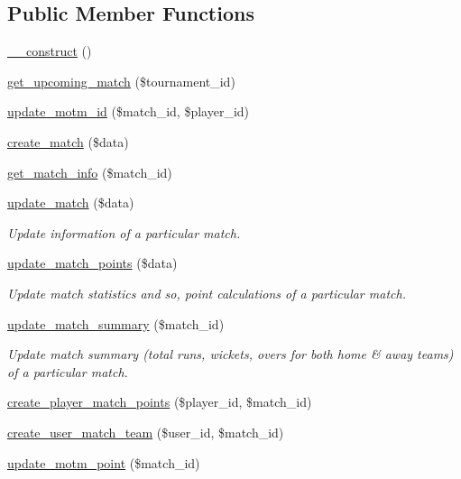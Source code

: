 \subsection*{Public Member Functions}
\begin{DoxyCompactItemize}
\item 
\hyperlink{class_match__model_a095c5d389db211932136b53f25f39685}{\+\_\+\+\_\+construct} ()
\item 
\hyperlink{class_match__model_af3e2fa219f3317391f8505b4fe790ada}{get\+\_\+upcoming\+\_\+match} (\$tournament\+\_\+id)
\item 
\hyperlink{class_match__model_a06064e208741b99d4c8f634bef3086b0}{update\+\_\+motm\+\_\+id} (\$match\+\_\+id, \$player\+\_\+id)
\item 
\hyperlink{class_match__model_ad797156fec1526814d0e7afa9922f453}{create\+\_\+match} (\$data)
\item 
\hyperlink{class_match__model_a0a059fea5654ff79dbd2aa1cc038e5e1}{get\+\_\+match\+\_\+info} (\$match\+\_\+id)
\item 
\hyperlink{class_match__model_ac88138156abfb53bfa57a299d788b43e}{update\+\_\+match} (\$data)
\begin{DoxyCompactList}\small\item\em Update information of a particular match. \end{DoxyCompactList}\item 
\hyperlink{class_match__model_a4ae724b3cc404915f9b4d33753278590}{update\+\_\+match\+\_\+points} (\$data)
\begin{DoxyCompactList}\small\item\em Update match statistics and so, point calculations of a particular match. \end{DoxyCompactList}\item 
\hyperlink{class_match__model_a3d20cfb9dc9afbd3bc39f748dd421edd}{update\+\_\+match\+\_\+summary} (\$match\+\_\+id)
\begin{DoxyCompactList}\small\item\em Update match summary (total runs, wickets, overs for both home \& away teams) of a particular match. \end{DoxyCompactList}\item 
\hyperlink{class_match__model_a80b0690e93edb4cb42c30f473724f0c7}{create\+\_\+player\+\_\+match\+\_\+points} (\$player\+\_\+id, \$match\+\_\+id)
\item 
\hyperlink{class_match__model_a4044fc0d4f237bb5785973b5b8e798c6}{create\+\_\+user\+\_\+match\+\_\+team} (\$user\+\_\+id, \$match\+\_\+id)
\item 
\hyperlink{class_match__model_ac6009e4ee467d728010e3745943c08b1}{update\+\_\+motm\+\_\+point} (\$match\+\_\+id)
\end{DoxyCompactItemize}



